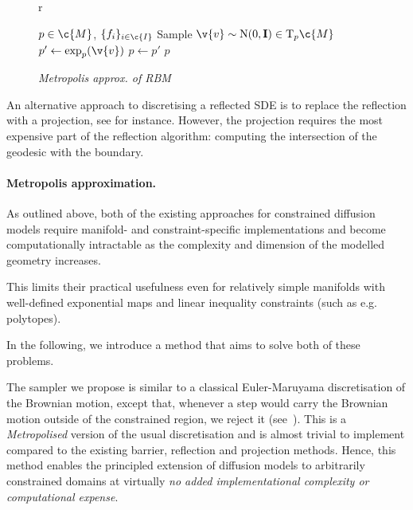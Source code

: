 \begin{figure}{r}
	\begin{minipage}{0.42\textwidth}
		\begin{algorithm}[H]
			\caption{\emph{Metropolis approx. of RBM}}
			\label{alg:metropolis_approx}
			\begin{algorithmic}
				\Require \(p \in \c{M}\), \(\{f_i\}_{i \in \c{I}}\)
				\State Sample \(\v{v} \sim \mathrm{N}(0,\m{I}) \in \mathrm{T}_p\c{M}\)
				\State \(p' \gets \exp_{p}(\v{v})\)
				\State \(p\gets p'\)
				\EndIf
				\Return \(p\)
			\end{algorithmic}
		\end{algorithm}
	\end{minipage}
\end{figure}
An alternative approach to discretising a reflected SDE is to replace the reflection with a projection, see \cite{slominski1994approximation} for instance.
However, the projection requires the most expensive part of the reflection algorithm: computing the intersection of the geodesic with the boundary.

\paragraph{Metropolis approximation.}
As outlined above, both of the existing approaches for constrained diffusion models require manifold- and constraint-specific implementations and become computationally intractable as the complexity and dimension of the modelled geometry increases.

This limits their practical usefulness even for relatively simple manifolds with well-defined exponential maps and linear inequality constraints (such as e.g. polytopes).

In the following, we introduce a method that aims to solve both of these problems.

The sampler we propose is similar to a classical Euler-Maruyama discretisation of the Brownian motion, except that, whenever a step would carry the Brownian motion outside of the constrained region, we reject it (see~).
This is a \emph{Metropolised} version of the usual discretisation and is almost trivial to implement compared to the existing barrier, reflection and projection methods.
Hence, this method enables the principled extension of diffusion models to arbitrarily constrained domains at virtually \emph{no added implementational complexity or computational expense}.

